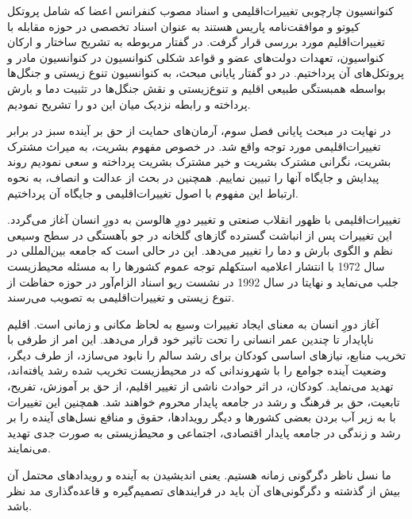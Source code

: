  کنوانسیون چارچوبی تغییرات‌اقلیمی و اسناد مصوب کنفرانس اعضا که شامل پروتکل‌ کیوتو و موافقت‌نامه پاریس هستند به عنوان اسناد تخصصی در حوزه مقابله با تغییرات‌اقلیم مورد بررسی قرار گرفت. 
 در گفتار مربوطه به تشریح ساختار و ارکان کنواسیون، تعهدات دولت‌های عضو و قواعد شکلی کنوانسیون در کنوانسیون مادر و پروتکل‌های آن پرداختیم. 
 در دو گفتار پایانی مبحث، به کنوانسیون تنوع زیستی و جنگل‌ها بواسطه همبستگی طبیعی اقلیم و تنوع‌زیستی  و نقش جنگل‌ها در تثبیت دما و بارش پرداخته و رابطه نزدیک میان این دو را تشریح نمودیم.
 
 در نهایت در مبحث پایانی فصل سوم، آرمان‌های حمایت از حق بر آینده سبز در برابر تغییرات‌اقلیمی مورد توجه واقع شد. در خصوص مفهوم بشریت، به میراث مشترک بشریت، نگرانی مشترک بشریت و خیر مشترک بشریت پرداخته و سعی نمودیم روند پیدایش و جایگاه آنها را تبیین نماییم. همچنین در بحث از عدالت و انصاف، به نحوه ارتباط این مفهوم با اصول تغییرات‌اقلیمی و جایگاه آن پرداختیم. 
 
 
 
 
 
 
 
 
 
 
 
 تغییرات‌اقلیمی با ظهور انقلاب صنعتی و تغییر دورِ هالوسن به دورِ انسان آغاز می‌گردد. این تغییرات پس از انباشت گسترده گاز‌های گلخانه در جو بآهستگی در سطح وسیعی نظم و الگوی بارش و دما را تغییر می‌دهد. این در حالی است که جامعه بین‌المللی در سال 1972 با انتشار اعلامیه استکهلم توجه عموم کشور‌ها را به مسئله محیط‌زیست جلب می‌نماید و نهایتا در سال 1992 در نشست ریو اسناد الزام‌آور در حوزه حفاظت از تنوع زیستی و تغییرات‌اقلیمی به تصویب می‌رسند. 
 
 آغاز دورِ انسان به معنای ایجاد تغییرات وسیع به لحاظ مکانی و زمانی است. اقلیم ناپایدار تا چندین عمر انسانی را تحت تاثیر خود قرار می‌دهد. این امر از طرفی با تخریب منابع، نیاز‌های اساسی کودکان برای رشد سالم را نابود می‌سازد، از طرف دیگر، وضعیت آینده جوامع را با شهروندانی که در محیط‌زیست تخریب شده رشد یافته‌اند، تهدید می‌نماید. کودکان، در اثر حوادث ناشی از تغییر اقلیم، از حق بر آموزش، تفریح، تابعیت، حق بر فرهنگ و رشد در جامعه پایدار محروم خواهند شد. همچنین این تغییرات با به زیر آب بردن بعضی کشور‌ها و دیگر رویداد‌ها، حقوق و منافع نسل‌های آینده را بر رشد و زندگی در جامعه پایدار اقتصادی، اجتماعی و محیط‌زیستی به صورت جدی تهدید می‌نمایند. 
 
 
 
 
 
 
 
 
 
 ما نسل ناظر دگرگونی زمانه هستیم. یعنی اندیشیدن به آینده و رویداد‌های محتمل آن بیش از گذشته و دگرگونی‌های آن باید در فرایند‌های تصمیم‌گیره و قاعده‌گذاری مد نظر باشد. 
 
